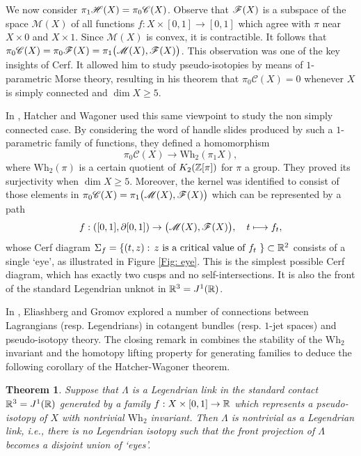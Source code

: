 \documentclass[11pt]{article}
\newcommand{\ie}{i.e.,\xspace}
\numberwithin{equation}{section}\providecommand{\dpl}{\displaystyle}
\let\mathcal\mathscr
\newcommand\mto{\mathchoice{\longmapsto}{\mapsto}{\mapsto}{\mapsto}}
\newcommand{\Wh}{\mathrm{Wh}}
\theoremstyle{plain}
\newtheorem{theorem}{Theorem}[section]
\theoremstyle{definition}
\newcommand{\cC}{\mathcal{C}}\newcommand{\cD}{\mathcal{D}}
\newcommand{\cM}{\mathcal{M}}\newcommand{\cN}{\mathcal{N}}
\begin{document}
We now consider $\pi_1\cH(X) = \pi_0 \cC(X)$. Observe that $\cF(X)$ is a subspace of the space $\cM(X)$ of all functions $f:X \times [0,1] \to [0,1]$ which agree with $\pi$ near $X \times 0$ and $X \times 1$. Since $\cM(X)$ is convex, it is contractible. It follows that $\pi_0 \cC(X) = \pi_0 \cF(X) = \pi_1 \big( \cM(X), \cF(X) \big)$. This observation was one of the key insights of Cerf. It allowed him to study pseudo-isotopies by means of $1$-parametric Morse theory, resulting in his theorem \cite{C70} that $\pi_0 \cC(X) =0$ whenever $X$ is simply connected and $\dim X \geq 5$.

In \cite{HW73}, Hatcher and Wagoner used this same viewpoint to study the non simply connected case. By considering the word of handle slides produced by such a $1$-parametric family of functions, they defined a homomorphism
\[ \pi_0 \cC(X) \to \Wh_2(\pi_1X ), \]
where $\Wh_2(\pi)$ is a certain quotient of $K_2( \mathbb{Z}[\pi])$ for $\pi$ a group. They proved its surjectivity when $\dim X \geq 5$. Moreover, the kernel was identified to consist of those elements in $\pi_0 \cC(X) = \pi_1 \big( \cM(X), \cF(X) \big)$ which can be represented by a path
\[ f: ([0,1],\partial [0,1]) \to \big(\cM(X), \cF(X)\big), \quad t \mto f_t,\]
whose Cerf diagram $\Sigma_f = \{ (t,z) : \, \text{$z$ is a critical value of $f_t$ } \} \subset \mathbb{R}^2$ consists of a single `eye', as illustrated in Figure \ref{Fig: eye}. This is the simplest possible Cerf diagram, which has exactly two cusps and no self-intersections. It is also the front of the standard Legendrian unknot in $\mathbb{R}^3=J^1(\mathbb{R})$.

In \cite{EG98}, Eliashberg and Gromov explored a number of connections between Lagrangians (resp. Legendrians) in cotangent bundles (resp. $1$-jet spaces) and pseudo-isotopy theory. The closing remark in \cite{EG98} combines the stability of the $\Wh_2$ invariant and the homotopy lifting property for generating families to deduce the following corollary of the Hatcher-Wagoner theorem.

\begin{theorem}\label{Theorem: wh1} Suppose that $\Lambda$ is a Legendrian link in the standard contact $\mathbb{R}^3=J^1(\mathbb{R})$ generated by a family $f:X \times [0,1] \to \mathbb{R}$ which represents a pseudo-isotopy of $X$ with nontrivial $\Wh_2$ invariant. Then $\Lambda$ is nontrivial as a Legendrian link, \ie there is no Legendrian isotopy such that the front projection of $\Lambda$ becomes a disjoint union of `eyes'. \end{theorem}
\end{document}
